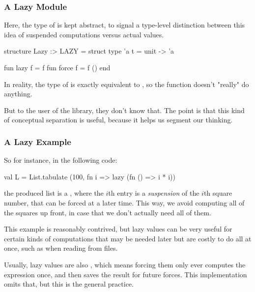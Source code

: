 \documentclass[aspectratio=169]{beamer}
\begin{document}
\begin{frame}[fragile]
  \frametitle{A Lazy Module}

  \tgs

  Here, the type of  is kept abstract, to signal a type-level
  distinction between this idea of suspended computations versus actual values.

  \pause
  \vspace{\fill}

  \begin{codeblock}
    structure Lazy :> LAZY =
      struct
        type 'a t = unit -> 'a

        fun lazy f  = f
        fun force f = f ()
      end
  \end{codeblock}

  In reality, the type of  is exactly equivalent to ,
  so the  function doesn't "really" do anything.

  \pause
  \vspace{\fill}

  But to the user of the library, they don't know that. The point is that this
  kind of conceptual separation is useful, because it helps us segment our
  thinking.
\end{frame}

\begin{frame}[fragile]
  \frametitle{A Lazy Example}

  So for instance, in the following code:
  \begin{codeblock}
    val L = List.tabulate (100, fn i => lazy (fn () => i * i))
  \end{codeblock}
  the produced list  is a , where the $i$th
  entry is a \textit{suspension} of the $i$th square number, that can be forced at a
  later time. This way, we avoid computing all of the squares up front, in case
  that we don't actually need all of them.

  \pause
  \vspace{\fill}

  This example is reasonably contrived, but lazy values can be very useful for
  certain kinds of computations that may be needed later but are costly to do
  all at once, such as when reading from files.

  \pause
  \vspace{\fill}

  Usually, lazy values are also , which means forcing them only
  ever computes the expression once, and then saves the result for future forces.
  This implementation omits that, but this is the general practice.
\end{frame}
\end{document}
